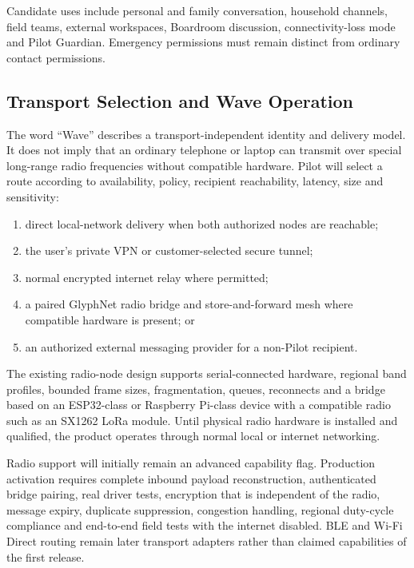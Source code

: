 Candidate uses include personal and family conversation, household channels,
field teams, external workspaces, Boardroom discussion, connectivity-loss mode
and Pilot Guardian. Emergency permissions must remain distinct from ordinary
contact permissions.

\subsection{Transport Selection and Wave Operation}

The word ``Wave'' describes a transport-independent identity and delivery
model. It does not imply that an ordinary telephone or laptop can transmit over
special long-range radio frequencies without compatible hardware. Pilot will
select a route according to availability, policy, recipient reachability,
latency, size and sensitivity:

\begin{enumerate}
  \item direct local-network delivery when both authorized nodes are reachable;
  \item the user's private VPN or customer-selected secure tunnel;
  \item normal encrypted internet relay where permitted;
  \item a paired GlyphNet radio bridge and store-and-forward mesh where
        compatible hardware is present; or
  \item an authorized external messaging provider for a non-Pilot recipient.
\end{enumerate}

The existing radio-node design supports serial-connected hardware, regional
band profiles, bounded frame sizes, fragmentation, queues, reconnects and a
bridge based on an ESP32-class or Raspberry Pi-class device with a compatible
radio such as an SX1262 LoRa module. Until physical radio hardware is installed
and qualified, the product operates through normal local or internet networking.

Radio support will initially remain an advanced capability flag. Production
activation requires complete inbound payload reconstruction, authenticated
bridge pairing, real driver tests, encryption that is independent of the radio,
message expiry, duplicate suppression, congestion handling, regional duty-cycle
compliance and end-to-end field tests with the internet disabled. BLE and
Wi-Fi Direct routing remain later transport adapters rather than claimed
capabilities of the first release.

